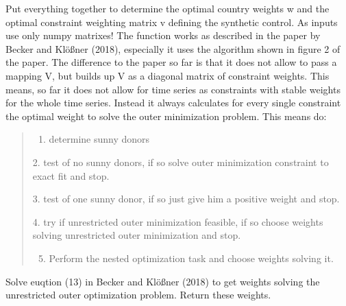 \documentclass[a4paper,11pt,english]{sphinxmanual}
\begin{document}

\begin{fulllineitems}
\label{model_code:src.model_code.synth_control_functions.determine_synthetic_control_weights}
Put everything together to determine the
optimal country weights w and the optimal constraint weighting matrix v
defining the synthetic control. As inputs use only numpy matrixes!
The function works as described in the paper by Becker and Klößner (2018),
especially it uses the algorithm shown in figure 2 of the paper. The
difference to the paper so far is that it does not allow to pass a mapping
V, but builds up V as a diagonal matrix of constraint weights. This means,
so far it does not allow for time series as constraints with stable weights
for the whole time series. Instead it always calculates for every single
constraint the optimal weight to solve the outer minimization problem.
This means do:
\begin{quote}
\begin{enumerate}
\item {} 
determine sunny donors

\end{enumerate}

2. test of no sunny donors, if so solve outer minimization constraint
to exact fit and stop.

3. test of one sunny donor, if so just give him a positive weight
and stop.

4. try if unrestricted outer minimization feasible, if so choose
weights solving unrestricted outer minimization and stop.
\begin{enumerate}
\setcounter{enumi}{4}
\item {} 
Perform the nested optimization task and choose weights solving it.

\end{enumerate}
\end{quote}

\end{fulllineitems}


\begin{fulllineitems}
\label{model_code:src.model_code.synth_control_functions.determine_unrestricted_outer_optimum}
Solve euqtion (13) in Becker and Klößner (2018) to get weights solving
the unrestricted outer optimization problem. Return these weights.

\end{fulllineitems}
\end{document}

